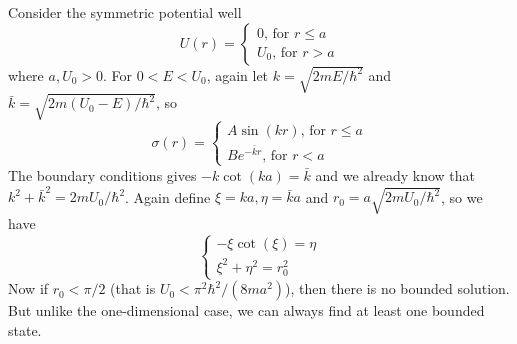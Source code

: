 \begin{example}
    Consider the symmetric potential well
    $$U(r)=\begin{cases}
        0\text{, for $r\le a$}\\
        U_0\text{, for $r>a$}
    \end{cases}$$
    where $a,U_0>0$.
    For $0<E<U_0$, again let $k=\sqrt{2mE/\hbar^2}$ and $\bar{k}=\sqrt{2m(U_0-E)/\hbar^2}$, so
    $$\sigma(r)=\begin{cases}
        A\sin(kr)\text{, for $r\le a$}\\
        Be^{-\bar{k}r}\text{, for $r<a$}
    \end{cases}$$
    The boundary conditions gives $-k\cot(ka)=\bar{k}$ and we already know that $k^2+\bar{k}^2=2mU_0/\hbar^2$.
    Again define $\xi=ka,\eta=\bar{k}a$ and $r_0=a\sqrt{2mU_0/\hbar^2}$, so we have
    $$\begin{cases}
        -\xi\cot(\xi)=\eta\\
        \xi^2+\eta^2=r_0^2
    \end{cases}$$
    Now if $r_0<\pi/2$ (that is $U_0<\pi^2\hbar^2/(8ma^2)$), then there is no bounded solution.
    But unlike the one-dimensional case, we can always find at least one bounded state.
\end{example}
